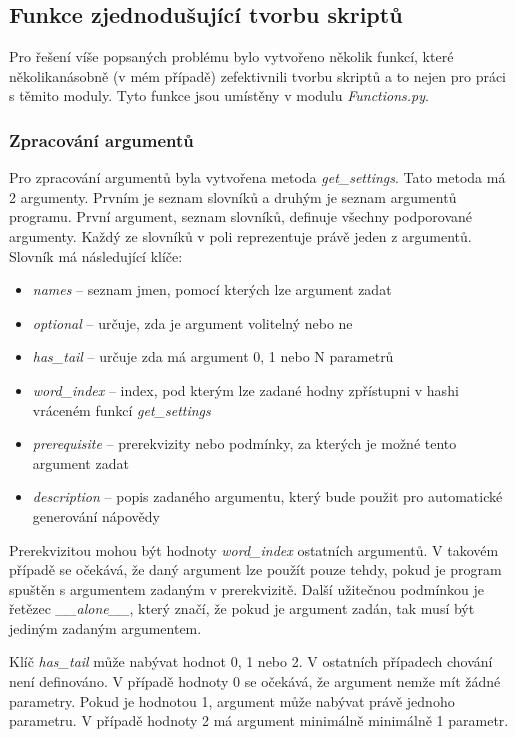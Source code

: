 \subsection{Funkce zjednodušující tvorbu skriptů}
Pro řešení víše popsaných problému bylo vytvořeno několik funkcí, které několikanásobně (v mém případě)
zefektivnili tvorbu skriptů a to nejen pro práci s těmito moduly. Tyto funkce jsou umístěny v modulu
\textit{Functions.py}.

\subsubsection{Zpracování argumentů}
Pro zpracování argumentů byla vytvořena metoda \textit{get\_settings}. Tato metoda má 2 argumenty.
Prvním je seznam slovníků a druhým je seznam argumentů programu. První argument, seznam slovníků, definuje
všechny podporované argumenty. Každý ze slovníků v poli reprezentuje právě jeden z argumentů.
Slovník má následující klíče:
\begin{itemize}
    \item \textit{names} -- seznam jmen, pomocí kterých lze argument zadat
    \item \textit{optional} -- určuje, zda je argument volitelný nebo ne
    \item \textit{has\_tail} -- určuje zda má argument 0, 1 nebo N parametrů
    \item \textit{word\_index} -- index, pod kterým lze zadané hodny zpřístupni v hashi vráceném funkcí \textit{get\_settings}
    \item \textit{prerequisite} -- prerekvizity nebo podmínky, za kterých je možné tento argument zadat
    \item \textit{description} -- popis zadaného argumentu, který bude použit pro automatické generování nápovědy
\end{itemize}
Prerekvizitou mohou být hodnoty \textit{word\_index} ostatních argumentů. V takovém případě se očekává,
že daný argument lze použít pouze tehdy, pokud je program spuštěn s argumentem zadaným v prerekvizitě.
Další užitečnou podmínkou je řetězec \textit{\_\_alone\_\_}, který značí, že pokud je argument zadán,
tak musí být jediným zadaným argumentem.

Klíč \textit{has\_tail} může nabývat hodnot 0, 1 nebo 2. V ostatních případech chování není definováno.
V případě hodnoty 0 se očekává, že argument nemže mít žádné parametry. Pokud je hodnotou 1, argument může
nabývat právě jednoho parametru. V případě hodnoty 2 má argument minimálně minimálně 1 parametr.

